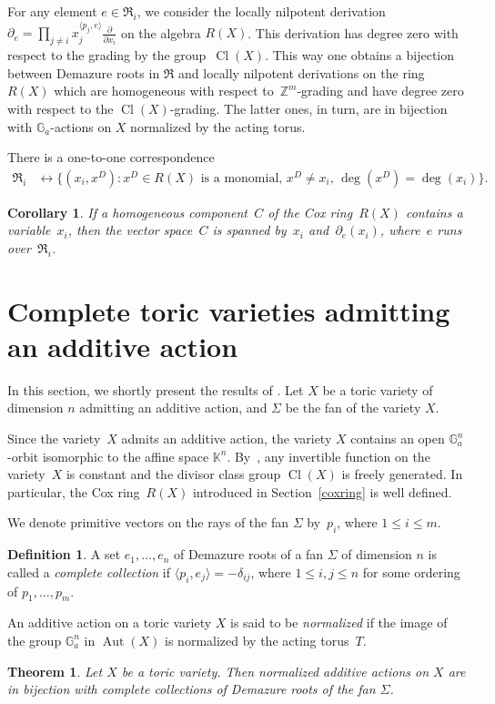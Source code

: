 \documentclass[a4paper,reqno,12pt]{amsart}
\DeclareMathOperator {\Cl}{Cl}
\DeclareMathOperator {\Aut}{Aut}
\def\Z  {\mathbb Z}
\def\Ga  {\mathbb G_a}
\def\K  {\mathbb K}
\newtheorem{corollary}{Corollary}
\newtheorem{theorem}{Theorem}
\theoremstyle{definition}
\newtheorem{defn}{Definition}
\begin{document}
For any element $e\in \mathfrak R_i$, we consider the locally nilpotent derivation $\partial_e = \prod_{j \neq i}x_{j}^{\langle p_j, e \rangle}\frac{\partial}{\partial x_i}$ on the algebra $R(X)$.
This derivation has degree zero with respect to the grading by the group~$\Cl(X)$.
This way one obtains a bijection between Demazure roots in $\mathfrak R$ and locally nilpotent derivations on the ring $R(X)$ which are homogeneous with respect to~$\Z^m$-grading and have degree zero with respect to the $\Cl(X)$-grading.
The latter ones, in turn, are in bijection with $\Ga$-actions on $X$ normalized by the acting torus.
\begin{stm}{\cite[Proposition~4.4]{Cox}}\label{homogeneousmonom}
  There is a one-to-one correspondence
  \[
    \begin{aligned}
      \mathfrak{R}_i &\leftrightarrow \{(x_i,x^D) : \text{$x^D
        \in {R}(X)$ is a
        monomial, $x^D \ne x_i$, $\deg(x^D) = \deg(x_i)$}\}.
    \end{aligned}
  \]
\end{stm}
\begin{corollary}\label{homogeneousbasis}
  If a homogeneous component~$C$ of the Cox ring~${R}(X)$ contains a variable~$x_i$, then the vector space~$C$ is spanned by~$x_i$ and~$\partial_e(x_i)$, where~$e$ runs over~$\mathfrak{R}_i$.
\end{corollary}
\section{Complete toric varieties admitting an additive action}\label{intrbas}
In this section, we shortly present the results of \cite{AR}.
Let $X$ be a toric variety of dimension $n$ admitting an additive action, and $\Sigma$ be the fan of the variety $X$.

Since the variety~$X$ admits an additive action, the variety $X$ contains an open $\Ga^n$-orbit isomorphic to the affine space $\K^n$.
By~\cite[Lemma~1]{APS}, any invertible function on the variety~$X$ is constant and the divisor class group $\Cl(X)$ is freely generated.
In particular, the Cox ring~$R(X)$ introduced in Section~\ref{coxring} is well defined.

We denote primitive vectors on the rays of the fan $\Sigma$ by~$p_i$, where $1 \leq i \leq m$.

\begin{defn} \label{completecollection}
A set $e_1,\ldots,e_n$ of Demazure roots of a fan $\Sigma$ of dimension $n$ is called a {\it complete collection} if $\langle p_i,e_j\rangle=-\delta_{ij}$, where $1\le i,j\le n$ for some ordering of $p_1, \ldots, p_m$.
\end{defn}
An additive action on a toric variety $X$ is said to be \emph{normalized} if the image of the group $\Ga^n$ in $\Aut(X)$ is normalized by the acting torus~$T$.
\begin{theorem}{\cite[Theorem 1]{AR}} \label{cc}
  Let $X$ be a toric variety. Then normalized additive actions on $X$ are in bijection with complete collections of Demazure roots of the fan $\Sigma$.
\end{theorem}
\end{document}
